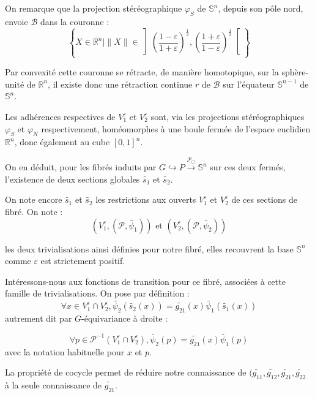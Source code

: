 \par
On remarque que la projection stéréographique $\varphi_S$ de $\mathbb{S}^n$, depuis son pôle nord, envoie $\mathcal{B}$ dans la couronne :
\[
\left\{ X \in \mathbb{R}^n | \|X\| \in \left] \left(\frac{1-\varepsilon}{1+\varepsilon}\right)^{\frac{1}{2}} , %
\left(\frac{1+\varepsilon}{1-\varepsilon}\right)^{\frac{1}{2}} \right[ \right\}
\]

Par convexité cette couronne se rétracte, de manière homotopique, sur la sphère-unité de $\mathbb{R}^n$, %
il existe donc une rétraction continue $r$ de $\mathcal{B}$ sur l'équateur $\mathbb{S}^{n-1}$ de $\mathbb{S}^n$.

\par
Les adhérences respectives de $V_1^{\varepsilon}$ et $V_2^{\varepsilon}$ sont, via les projections stéréographiques $\varphi_S$ et $\varphi_N$ respectivement, %
homéomorphes à une boule fermée de l'espace euclidien $\mathbb{R}^n$, donc également au cube $[0,1]^n$.

\par
On en déduit, pour les fibrés induits par $G \hookrightarrow P \xrightarrow{\mathcal{P}_{\Box}} \mathbb{S}^n$ sur ces deux fermés, %
l'existence de deux sections globales $\tilde{s_1}$ et $\tilde{s_2}$.

\par
On note encore $\tilde{s_1}$ et $\tilde{s_2}$ les restrictions aux ouverts $V_1^{\varepsilon}$ et $V_2^{\varepsilon}$ de ces sections de fibré. On note :
\[(V_1^{\varepsilon},(\mathcal{P},\tilde{\psi_1}))\text{ et }(V_2^{\varepsilon},(\mathcal{P},\tilde{\psi_2}))\]

les deux trivialisations ainsi définies pour notre fibré, elles recouvrent la base $\mathbb{S}^n$ comme $\varepsilon$ est strictement positif.

\par
Intéressons-nous aux fonctions de transition pour ce fibré, associées à cette famille de trivialisations. On pose par définition :
\[
\forall x \in V_1^{\varepsilon} \cap V_2^{\varepsilon} , \tilde{\psi_2}(\tilde{s_2}(x)) = \tilde{g_{21}}(x) \tilde{\psi_1}(\tilde{s_1}(x))
\]
autrement dit par $G$-équivariance à droite :

\[\forall p \in \mathcal{P}^{-1}(V_1^{\varepsilon} \cap V_2^{\varepsilon}) , \tilde{\psi_2}(p) = \tilde{g_{21}}(x) \tilde{\psi_1}(p)\]
avec la notation habituelle pour $x$ et $p$.

\par
La propriété de cocycle permet de réduire notre connaissance de $(\tilde{g_{11}},\tilde{g_{12}},\tilde{g_{21}},\tilde{g_{22}}$ à la seule connaissance de $\tilde{g_{21}}$.

